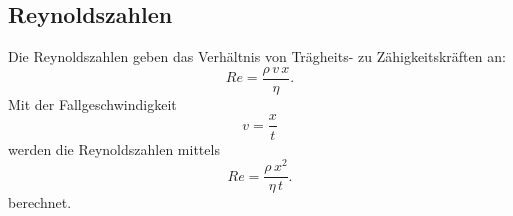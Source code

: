 \subsection{Reynoldszahlen}
Die Reynoldszahlen geben das Verhältnis von Trägheits- zu
Zähigkeitskräften an:
\begin{equation*}
    Re = \frac{\rho \, v \, x}{\eta}.
\end{equation*}
Mit der Fallgeschwindigkeit
\begin{equation}
    v = \frac{x}{t}
    \label{eqn:v}
\end{equation}
werden die Reynoldszahlen mittels
\begin{equation}
    Re = \frac{\rho \, x^2}{\eta \, t}.
    \label{eqn:Re}
\end{equation}
berechnet.
